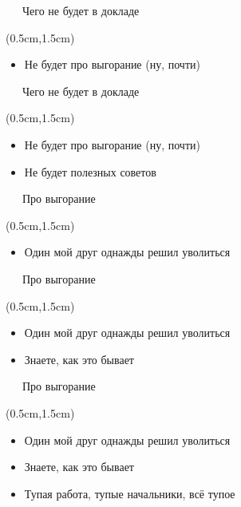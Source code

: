 \documentclass[xetex,18pt,aspectratio=43]{beamer}
\begin{document}
\begin{Large}

\begin{frame}{\ \ \ Чего не будет в докладе}
\begin{textblock*}{\framewidth-0.8cm}(0.5cm,1.5cm)
\begin{itemize}
  \item Не будет про выгорание (ну, почти)
\end{itemize}
\end{textblock*}
\end{frame}

\begin{frame}{\ \ \ Чего не будет в докладе}
\begin{textblock*}{\framewidth-0.8cm}(0.5cm,1.5cm)
\begin{itemize}
  \item Не будет про выгорание (ну, почти)
  \item Не будет полезных советов
\end{itemize}
\end{textblock*}
\end{frame}

\begin{frame}{\ \ \ Про выгорание}
\begin{textblock*}{\framewidth-0.8cm}(0.5cm,1.5cm)
\begin{itemize}
  \item Один мой друг однажды решил уволиться
\end{itemize}
\end{textblock*}
\end{frame}

\begin{frame}{\ \ \ Про выгорание}
\begin{textblock*}{\framewidth-0.8cm}(0.5cm,1.5cm)
\begin{itemize}
  \item Один мой друг однажды решил уволиться
  \item Знаете, как это бывает
\end{itemize}
\end{textblock*}
\end{frame}

\begin{frame}{\ \ \ Про выгорание}
\begin{textblock*}{\framewidth-0.8cm}(0.5cm,1.5cm)
\begin{itemize}
  \item Один мой друг однажды решил уволиться
  \item Знаете, как это бывает
  \item Тупая работа, тупые начальники, всё тупое
\end{itemize}
\end{textblock*}
\end{frame}


\end{Large}
\end{document}
